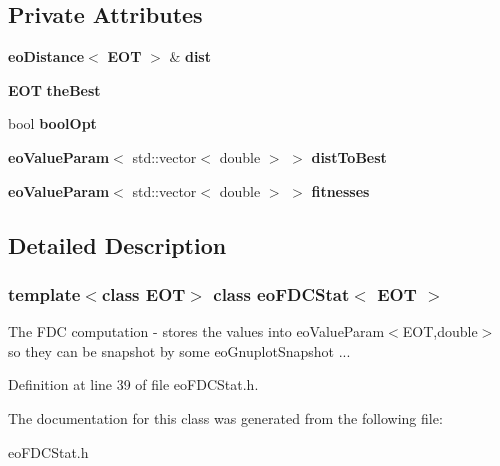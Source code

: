 \subsection*{Private Attributes}
\begin{CompactItemize}
\item 
{\bf eo\-Distance}$<$ {\bf EOT} $>$ \& {\bf dist}\label{classeo_f_d_c_stat_r0}

\item 
{\bf EOT} {\bf the\-Best}\label{classeo_f_d_c_stat_r1}

\item 
bool {\bf bool\-Opt}\label{classeo_f_d_c_stat_r2}

\item 
{\bf eo\-Value\-Param}$<$ std::vector$<$ double $>$ $>$ {\bf dist\-To\-Best}\label{classeo_f_d_c_stat_r3}

\item 
{\bf eo\-Value\-Param}$<$ std::vector$<$ double $>$ $>$ {\bf fitnesses}\label{classeo_f_d_c_stat_r4}

\end{CompactItemize}


\subsection{Detailed Description}
\subsubsection*{template$<$class EOT$>$ class eo\-FDCStat$<$ EOT $>$}

The FDC computation - stores the values into eo\-Value\-Param$<$EOT,double$>$ so they can be snapshot by some eo\-Gnuplot\-Snapshot ... 



Definition at line 39 of file eo\-FDCStat.h.

The documentation for this class was generated from the following file:\begin{CompactItemize}
\item 
eo\-FDCStat.h\end{CompactItemize}
